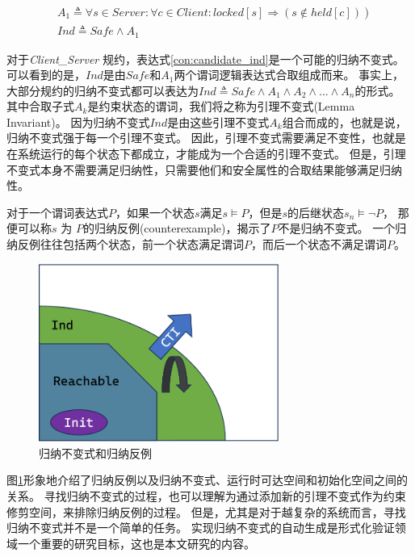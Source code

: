 \begin{align}
    &\left.A_{1} \triangleq \forall s \in  { Server }: \forall c \in  { Client }:  { locked }[s] \Rightarrow(s \notin { held }[c])\right) \\
    &{ Ind } \triangleq  { Safe } \wedge A_{1} \label{con:candidate_ind}
\end{align}

对于\textit{Client\_Server} 规约，表达式\ref{con:candidate_ind}是一个可能的归纳不变式。
可以看到的是，$Ind$是由$Safe$和$A_{1}$两个谓词逻辑表达式合取组成而来。
事实上，大部分规约的归纳不变式都可以表达为$Ind \triangleq Safe \wedge A_1 \wedge A_2 \wedge... \wedge A_n$的形式。
其中合取子式$A_k$是约束状态的谓词，我们将之称为引理不变式(Lemma Invariant)。
因为归纳不变式$Ind$是由这些引理不变式$A_k$组合而成的，也就是说，归纳不变式强于每一个引理不变式。
因此，引理不变式需要满足不变性，也就是在系统运行的每个状态下都成立，才能成为一个合适的引理不变式。
但是，引理不变式本身不需要满足归纳性，只需要他们和安全属性的合取结果能够满足归纳性。

对于一个谓词表达式$P$，如果一个状态$s$满足$s \models P$，但是$s$的后继状态$s_{n} \models \neg P$，
那便可以称$s$ 为 $P$的归纳反例(counterexample)，揭示了$P$不是归纳不变式。
一个归纳反例往往包括两个状态，前一个状态满足谓词$P$，而后一个状态不满足谓词$P$。

\begin{figure}
    \centering
    \includegraphics[width=0.7\textwidth]{figures/ind-cti.pdf}
    \caption{归纳不变式和归纳反例}
    \label{fig:ind-cti}
\end{figure}
图\ref{fig:ind-cti}形象地介绍了归纳反例以及归纳不变式、运行时可达空间和初始化空间之间的关系。
寻找归纳不变式的过程，也可以理解为通过添加新的引理不变式作为约束修剪空间，来排除归纳反例的过程。
但是，尤其是对于越复杂的系统而言，寻找归纳不变式并不是一个简单的任务。
实现归纳不变式的自动生成是形式化验证领域一个重要的研究目标，这也是本文研究的内容。

